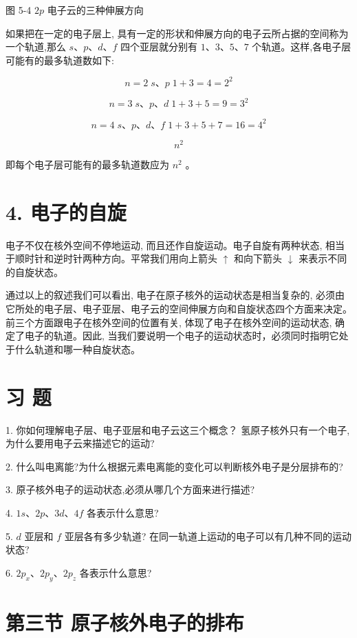 \documentclass[10pt]{article}
\begin{document}
图 5-4 \({2p}\) 电子云的三种伸展方向

如果把在一定的电子层上, 具有一定的形状和伸展方向的电子云所占据的空间称为一个轨道,那么 \(s\text{、}p\text{、}d\text{、}f\) 四个亚层就分别有 \(1\text{、}3\text{、}5\text{、}7\) 个轨道。这样,各电子层可能有的最多轨道数如下:

\[
n = 2\;s\text{、}p\;1 + 3 = 4 = {2}^{2}
\]

\[
n = 3\;s\text{、}p\text{、}d\;1 + 3 + 5 = 9 = {3}^{2}
\]

\[
n = 4\;s\text{、}p\text{、}d\text{、}f\;1 + 3 + 5 + 7 = {16} = {4}^{2}
\]

\[
{n}^{2}
\]

即每个电子层可能有的最多轨道数应为 \({n}^{2}\) 。

\section*{4. 电子的自旋}

电子不仅在核外空间不停地运动, 而且还作自旋运动。电子自旋有两种状态, 相当于顺时针和逆时针两种方向。平常我们用向上箭头 \(\uparrow\) 和向下箭头 \(\downarrow\) 来表示不同的自旋状态。

通过以上的叙述我们可以看出, 电子在原子核外的运动状态是相当复杂的, 必须由它所处的电子层、电子亚层、电子云的空间伸展方向和自旋状态四个方面来决定。前三个方面跟电子在核外空间的位置有关, 体现了电子在核外空间的运动状态, 确定了电子的轨道。因此, 当我们要说明一个电子的运动状态时，必须同时指明它处于什么轨道和哪一种自旋状态。

\section*{习 题}

1. 你如何理解电子层、电子亚层和电子云这三个概念？ 氢原子核外只有一个电子, 为什么要用电子云来描述它的运动?

2. 什么叫电离能?为什么根据元素电离能的变化可以判断核外电子是分层排布的?

3. 原子核外电子的运动状态,必须从哪几个方面来进行描述?

4. \({1s}\text{、}{2p}\text{、}{3d}\text{、}{4f}\) 各表示什么意思?

5. \(d\) 亚层和 \(f\) 亚层各有多少轨道? 在同一轨道上运动的电子可以有几种不同的运动状态?

6. \(2{p}_{x}\text{、}2{p}_{y}\text{、}2{p}_{z}\) 各表示什么意思?

\section*{第三节 原子核外电子的排布}
\end{document}
